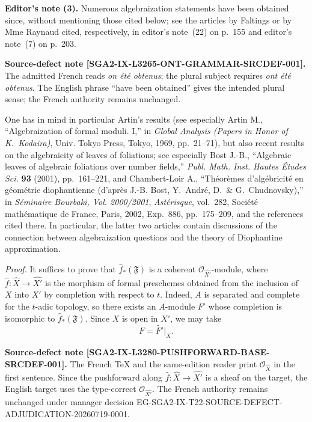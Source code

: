 \documentclass[11pt,a4paper,oneside]{book}
\theoremstyle{plain}
\theoremstyle{definition}
\theoremstyle{remark}
\begin{document}
\medskip
\noindent\colorbox{softgray}{\parbox{0.95\linewidth}{\small
\color{notegray}\textbf{Editor's note (3).}
Numerous algebraization statements have been obtained since, without
mentioning those cited below; see the articles by Faltings or by Mme Raynaud
cited, respectively, in editor's note~(22) on p.~155 and editor's note~(7)
on p.~203.

\smallskip
{\footnotesize\textbf{Source-defect note
[SGA2-IX-L3265-ONT-GRAMMAR-SRCDEF-001].}
The admitted French reads \emph{on \'et\'e obtenus}; the plural subject
requires \emph{ont \'et\'e obtenus}. The English phrase ``have been
obtained'' gives the intended plural sense; the French authority remains
unchanged.}

\smallskip
One has in mind in particular Artin's results (see especially
Artin M., ``Algebraization of formal moduli. I,'' in \emph{Global Analysis
(Papers in Honor of K.~Kodaira)}, Univ. Tokyo Press, Tokyo, 1969,
pp.~21--71), but also recent results on the algebraicity of leaves of
foliations; see especially Bost J.-B., ``Algebraic leaves of algebraic
foliations over number fields,'' \emph{Publ. Math. Inst. Hautes
\'Etudes Sci.} \textbf{93} (2001), pp.~161--221, and Chambert-Loir A.,
``Th\'eor\`emes d'alg\'ebricit\'e en g\'eom\'etrie diophantienne (d'apr\`es
J.-B. Bost, Y.~Andr\'e, D.~\& G.~Chudnovsky),'' in \emph{S\'eminaire
Bourbaki, Vol. 2000/2001}, \emph{Ast\'erisque}, vol.~282, Soci\'et\'e
math\'ematique de France, Paris, 2002, Exp.~886, pp.~175--209, and the
references cited there. In particular, the latter two articles contain
discussions of the connection between algebraization questions and the
theory of Diophantine approximation.}}

\medskip
\noindent\textit{Proof.}\quad
It suffices to prove that $\widehat f_*(\mathfrak F)$ is a coherent
$\mathcal O_{\widehat{X'}}$-module, where
$\widehat f\colon\widehat X\to\widehat{X'}$ is the morphism of formal
preschemes obtained from the inclusion of $X$ into $X'$ by completion with
respect to $t$. Indeed, $A$ is separated and complete for the $t$-adic
topology, so there exists an $A$-module $F'$ whose completion is isomorphic
to $\widehat f_*(\mathfrak F)$. Since $X$ is open in $X'$, we may take
\[
F=\widetilde{F'}\big|_X.
\]

\noindent\colorbox{softgray}{\parbox{0.95\linewidth}{\footnotesize
\color{notegray}\textbf{Source-defect note
[SGA2-IX-L3280-PUSHFORWARD-BASE-SRCDEF-001].}
The French TeX and the same-edition reader print
$\mathcal O_{\widehat X}$ in the first sentence. Since the pushforward along
$\widehat f\colon\widehat X\to\widehat{X'}$ is a sheaf on the target, the
English target uses the type-correct $\mathcal O_{\widehat{X'}}$. The French
authority remains unchanged under manager decision
EG-SGA2-IX-T22-SOURCE-DEFECT-ADJUDICATION-20260719-0001.}}
\end{document}
